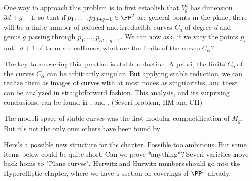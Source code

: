One way to approach this problem is to first establish that  $V^d_g$ has dimension $3d+g-1$, so that if $p_1,\dots,p_{3d+g-1} \in \PP^2$ are general points in the plane, there will be a finite number of reduced and irreducible curves $C_\alpha$ of degree $d$ and genus $g$ passing through $p_1,\dots,p_{3d+g-1}$. We can now ask, if we vary the points $p_i$ until $d+1$ of them are collinear, what are the limits of the curves $C_\alpha$?

The key to answering this question is stable reduction. A priori, the limits $C_0$ of the curves $C_\alpha$ can be arbitrarily singular. But applying stable reduction, we can realize them as images of curves with at most nodes as singularities, and these can be analyzed in straightforward fashion. This analysis, and its surprising conclusions, can be found in \cite{**},  \cite{**} and  \cite{**}. (Severi problem, HM and CH)

The moduli space of stable curves was the first modular compactification of $M_g$. But it's not the only one; others have been found by

\newpage

Here's a possible new structure for the chapter. Possible too ambitious. But some items below could be quite short. Can we prove *anything*? Severi varieties move back home to "Plane curves". Hurwitz and Hurwitz numbers should go into the Hyperelliptic chapter, where we have a section on coverings of $\PP^1$ already.

